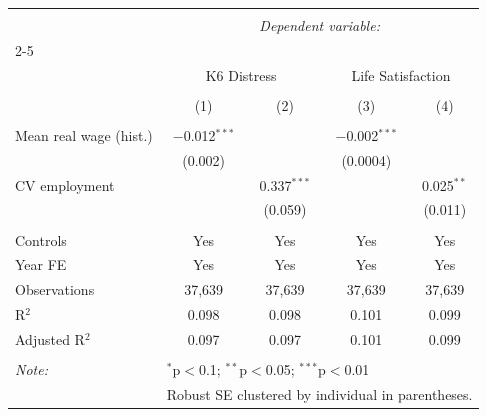 
\begin{tabular}{@{\extracolsep{1pt}}lcccc} 
\\[-1.8ex]\hline 
\hline \\[-1.8ex] 
 & \multicolumn{4}{c}{\textit{Dependent variable:}} \\ 
\cline{2-5} 
\\[-1.8ex] & \multicolumn{2}{c}{K6 Distress} & \multicolumn{2}{c}{Life Satisfaction} \\ 
\\[-1.8ex] & (1) & (2) & (3) & (4)\\ 
\hline \\[-1.8ex] 
 Mean real wage (hist.) & $-$0.012$^{***}$ &  & $-$0.002$^{***}$ &  \\ 
  & (0.002) &  & (0.0004) &  \\ 
  CV employment &  & 0.337$^{***}$ &  & 0.025$^{**}$ \\ 
  &  & (0.059) &  & (0.011) \\ 
 \hline \\[-1.8ex] 
Controls & Yes & Yes & Yes & Yes \\ 
Year FE & Yes & Yes & Yes & Yes \\ 
Observations & 37,639 & 37,639 & 37,639 & 37,639 \\ 
R$^{2}$ & 0.098 & 0.098 & 0.101 & 0.099 \\ 
Adjusted R$^{2}$ & 0.097 & 0.097 & 0.101 & 0.099 \\ 
\hline 
\hline \\[-1.8ex] 
\textit{Note:}  & \multicolumn{4}{l}{$^{*}$p$<$0.1; $^{**}$p$<$0.05; $^{***}$p$<$0.01} \\ 
 & \multicolumn{4}{l}{Robust SE clustered by individual in parentheses.} \\ 
\end{tabular} 
